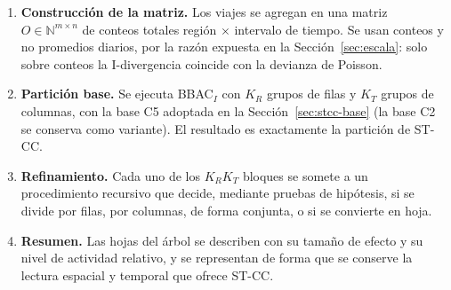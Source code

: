 \begin{enumerate}
  \item \textbf{Construcción de la matriz.} Los viajes se agregan en una
  matriz $O \in \mathbb{N}^{m\times n}$ de conteos totales región $\times$
  intervalo de tiempo. Se usan conteos y no promedios diarios, por la razón
  expuesta en la Sección~\ref{sec:escala}: solo sobre conteos la
  I-divergencia coincide con la devianza de Poisson.
  \item \textbf{Partición base.} Se ejecuta BBAC$_I$ con $K_R$ grupos de
  filas y $K_T$ grupos de columnas, con la base C5 adoptada en la
  Sección~\ref{sec:stcc-base} (la base C2 se conserva como variante). El
  resultado es exactamente la partición de ST-CC.
  \item \textbf{Refinamiento.} Cada uno de los $K_R K_T$ bloques se somete a
  un procedimiento recursivo que decide, mediante pruebas de hipótesis, si se
  divide por filas, por columnas, de forma conjunta, o si se convierte en hoja.
  \item \textbf{Resumen.} Las hojas del árbol se describen con su tamaño de
  efecto y su nivel de actividad relativo, y se representan de forma que se
  conserve la lectura espacial y temporal que ofrece ST-CC.
\end{enumerate}

